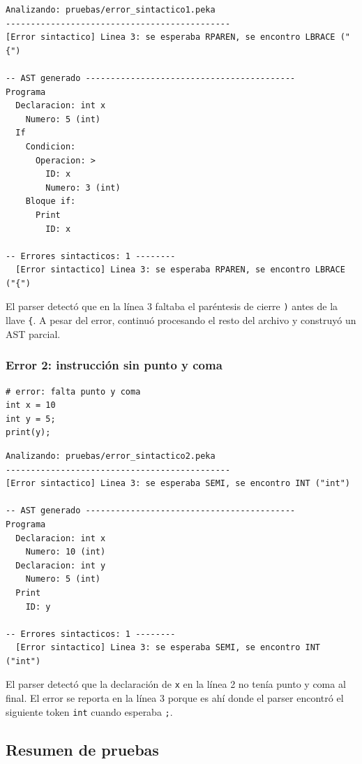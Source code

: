 \documentclass[12pt]{article}
\begin{document}
\begin{lstlisting}[caption={Salida -- error\_sintactico1.peka}]
Analizando: pruebas/error_sintactico1.peka
---------------------------------------------
[Error sintactico] Linea 3: se esperaba RPAREN, se encontro LBRACE ("{")

-- AST generado ------------------------------------------
Programa
  Declaracion: int x
    Numero: 5 (int)
  If
    Condicion:
      Operacion: >
        ID: x
        Numero: 3 (int)
    Bloque if:
      Print
        ID: x

-- Errores sintacticos: 1 --------
  [Error sintactico] Linea 3: se esperaba RPAREN, se encontro LBRACE ("{")
\end{lstlisting}

\noindent
El parser detectó que en la línea 3 faltaba el paréntesis de cierre
\texttt{)} antes de la llave \texttt{\{}. A pesar del error, continuó
procesando el resto del archivo y construyó un AST parcial.

\subsubsection{Error 2: instrucción sin punto y coma}

\begin{lstlisting}[caption={error\_sintactico2.peka}]
# error: falta punto y coma
int x = 10
int y = 5;
print(y);
\end{lstlisting}

\begin{lstlisting}[caption={Salida -- error\_sintactico2.peka}]
Analizando: pruebas/error_sintactico2.peka
---------------------------------------------
[Error sintactico] Linea 3: se esperaba SEMI, se encontro INT ("int")

-- AST generado ------------------------------------------
Programa
  Declaracion: int x
    Numero: 10 (int)
  Declaracion: int y
    Numero: 5 (int)
  Print
    ID: y

-- Errores sintacticos: 1 --------
  [Error sintactico] Linea 3: se esperaba SEMI, se encontro INT ("int")
\end{lstlisting}

\noindent
El parser detectó que la declaración de \texttt{x} en la línea 2 no
tenía punto y coma al final. El error se reporta en la línea 3 porque
es ahí donde el parser encontró el siguiente token \texttt{int} cuando
esperaba \texttt{;}.

\subsection{Resumen de pruebas}
\end{document}
